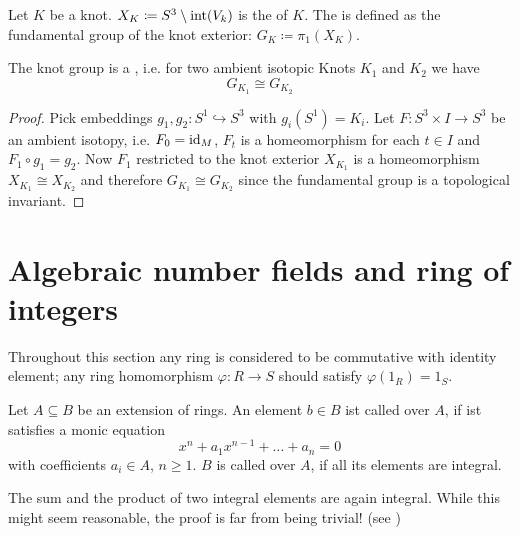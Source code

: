 \begin{definition}
	Let $K$ be a knot. $X_K \coloneqq S^3 \setminus \operatorname{int}(V_k)$ is the  of $K$.
	The  is defined as the fundamental group of the knot exterior: $G_K \coloneqq \pi_1(X_K)$.
\end{definition}

\begin{lemma}
	The knot group is a , i.e. for two ambient isotopic Knots $K_1$ and $K_2$ we have
	\[
		G_{K_1} \cong G_{K_2}
	\]
\end{lemma}
\begin{proof}
	Pick embeddings $g_1, g_2 \colon S^1 \hookrightarrow S^3$ with $g_i(S^1)=K_i$.
	Let $F \colon S^3 \times I \to S^3$ be an ambient isotopy, i.e. $F_0 = {\operatorname{id}_M}$, $F_t$ is a homeomorphism for each $t \in I$ and $F_1 \circ g_1 = g_2$.
	Now $F_1$ restricted to the knot exterior $X_{K_1}$ is a homeomorphism $X_{K_1} \cong X_{K_2}$ and therefore $G_{K_1} \cong G_{K_2}$ since the fundamental group is a topological invariant.
\end{proof}






\section{Algebraic number fields and ring of integers} %
\label{sec:rings_and_ideals}
Throughout this section any ring is considered to be commutative with identity element; any ring homomorphism $\varphi \colon R \to S$ should satisfy $\varphi(1_R) =1_S$.

\begin{definition}[{name=[Integral Elements]{\cite[Def.~2.1]{neukirch}}}]
	Let $A \subseteq B$ be an extension of rings.
	An element $b \in B$ ist called  over $A$, if ist satisfies a monic equation
	\[
		x^n + a_1 x^{n-1} + \ldots + a_n =0
	\]
	with coefficients $a_i \in A$, $n\ge 1$.
	$B$ is called  over $A$, if all its elements are integral.
\end{definition}

\begin{remark}
	The sum and the product of two integral elements are again integral.
	While this might seem reasonable, the proof is far from being trivial! (see \textcite[Prop.~2.2]{neukirch})
\end{remark}


